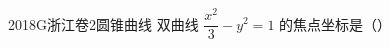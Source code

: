 
\begin{problem}{2018}{G}{浙江卷}{2}{圆锥曲线}
双曲线 $ \dfrac{x^2}{3}-y^2=1 $ 的焦点坐标是（\hspace{1cm}）
\begin{choices}
\end{choices}
\end{problem}

\begin{answer}

\end{answer}

\begin{solutions}

\end{solutions}